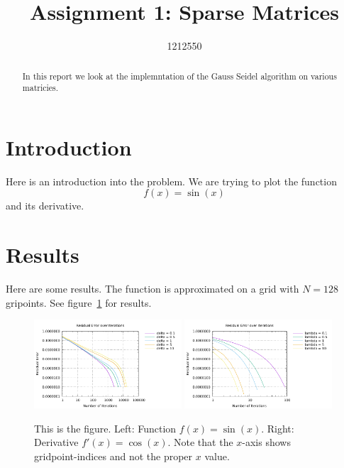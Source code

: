 \documentclass[10pt]{article}
\begin{document}
\title{Assignment 1: Sparse Matrices}
\author{1212550}


\maketitle
\begin{abstract}
  In this report we look at the implemntation of the Gauss Seidel algorithm on various matricies.
\end{abstract}

\section{Introduction}

Here is an introduction into the problem. We are trying to plot the function
\begin{equation}
  f(x) = \sin(x)
\end{equation}
and its derivative.

\section{Results}

Here are some results. The function is approximated on a grid with
$N=128$ gripoints. See figure~\ref{fig:func_and_deriv} for results.
 \begin{figure}%
 \begin{center}
    \includegraphics[width=0.49\textwidth]{function}
    \includegraphics[width=0.49\textwidth]{function2}
  \end{center}
  \caption{This is the figure. Left: Function $f(x)=\sin(x)$. Right:
    Derivative $f'(x) = \cos(x)$. Note that the $x$-axis shows
    gridpoint-indices and not the proper $x$ value.
  \label{fig:func_and_deriv}}
\end{figure}
\end{document}
